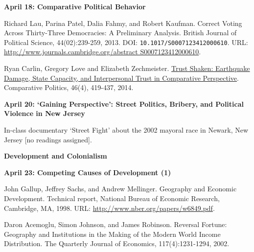 \documentclass[letterpaper]{article}
\renewenvironment{itemize}{
  \begin{list}{}{
    \setlength{\leftmargin}{1.5em}
  }
}{
  \end{list}
}
\begin{document}
\begin{enumerate}
	\begin{itemize} 
		\item {\bf April 18: Comparative Political Behavior}
		\begin{itemize}
			\item[$\bullet$] Richard Lau, Parina Patel, Dalia Fahmy, and Robert Kaufman. Correct Voting Across Thirty-Three Democracies: A Preliminary Analysis. British Journal of Political Science, 44(02):239-259, 2013. DOI: \texttt{10.1017/S0007123412000610}. URL: \url{http://www.journals.cambridge.org/abstract S0007123412000610}.
			\item[$\bullet$] Ryan Carlin, Gregory Love and Elizabeth Zechmeister. \href{ http://www.jstor.org/stable/43664117}{Trust Shaken: Earthquake Damage, State Capacity, and Interpersonal Trust in Comparative Perspective}. Comparative Politics, 46(4), 419-437, 2014.
		\end{itemize}
	\end{itemize}


	\begin{itemize} 
		\item {\bf April 20: `Gaining Perspective': Street Politics, Bribery, and Political Violence in New Jersey}
		\begin{itemize}
			\item[$\bullet$] In-class documentary `Street Fight' about the 2002 mayoral race in Newark, New Jersey [no readings assigned].
		\end{itemize}
	\end{itemize}




\item {\bf Development and Colonialism}
	\begin{itemize}
		\item {\bf April 23: Competing Causes of Development (1)}
		\begin{itemize}
			\item[$\bullet$] John Gallup, Jeffrey Sachs, and Andrew Mellinger. Geography and Economic Development. Technical report, National Bureau of Economic Research, Cambridge, MA, 1998. URL: \url{http://www.nber.org/papers/w6849.pdf}.

			\item[$\bullet$] Daron Acemoglu, Simon Johnson, and James Robinson. Reversal Fortune: Geography and Institutions in the Making of the Modern World Income Distribution. The Quarterly Journal of Economics, 117(4):1231-1294, 2002.
		\end{itemize}


\end{itemize}
\end{enumerate}
\end{document}
